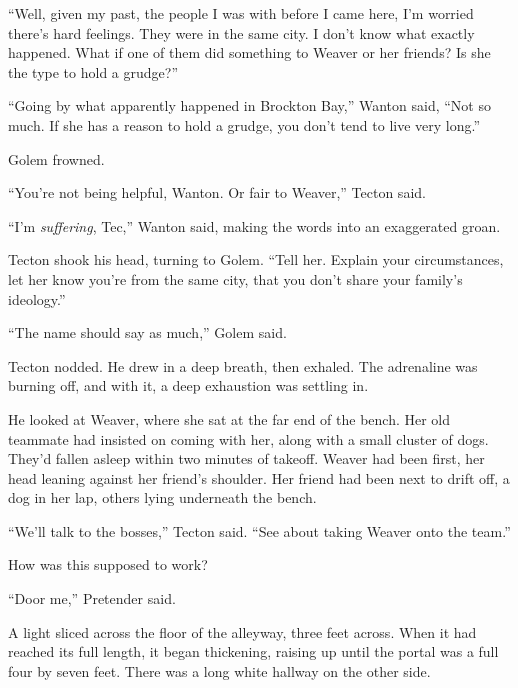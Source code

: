 ``Well, given my past, the people I was with before I came here, I'm worried there's hard feelings.  They were in the same city.  I don't know what exactly happened.  What if one of them did something to Weaver or her friends?  Is she the type to hold a grudge?''



``Going by what apparently happened in Brockton Bay,'' Wanton said, ``Not so much.  If she has a reason to hold a grudge, you don't tend to live very long.''



Golem frowned.



``You're not being helpful, Wanton.  Or fair to Weaver,'' Tecton said.



``I'm \emph{suffering}, Tec,'' Wanton said, making the words into an exaggerated groan.



Tecton shook his head, turning to Golem.  ``Tell her.  Explain your circumstances, let her know you're from the same city, that you don't share your family's ideology.''



``The name should say as much,'' Golem said.



Tecton nodded.  He drew in a deep breath, then exhaled.  The adrenaline was burning off, and with it, a deep exhaustion was settling in.



He looked at Weaver, where she sat at the far end of the bench.  Her old teammate had insisted on coming with her, along with a small cluster of dogs.  They'd fallen asleep within two minutes of takeoff.  Weaver had been first, her head leaning against her friend's shoulder.  Her friend had been next to drift off, a dog in her lap, others lying underneath the bench.



``We'll talk to the bosses,'' Tecton said.  ``See about taking Weaver onto the team.''



\sectionbreak



How was this supposed to work?



``Door me,'' Pretender said.



A light sliced across the floor of the alleyway, three feet across.  When it had reached its full length, it began thickening, raising up until the portal was a full four by seven feet.  There was a long white hallway on the other side.



